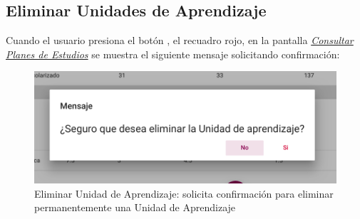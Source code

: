 \subsection{Eliminar Unidades de Aprendizaje}
Cuando el usuario presiona el botón , el recuadro rojo, en la pantalla \hyperlink{consultarUA}{\textit{Consultar Planes de Estudios}} se muestra el siguiente mensaje solicitando confirmación:\\
\begin{figure}[H]
    \centering
    \hypertarget{EliminarUA}{\includegraphics[width=0.7\linewidth]{images/GUA/EliminarUA}}
    \caption{Eliminar Unidad de Aprendizaje: solicita confirmación para eliminar permanentemente una Unidad de Aprendizaje}
    \label{EliminarUA}
\end{figure}